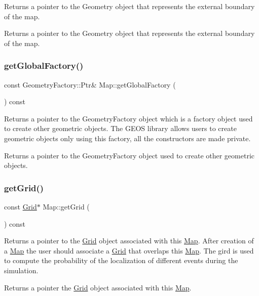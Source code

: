 Returns a pointer to the Geometry object that represents the external boundary of the map. \begin{DoxyReturn}{Returns}
a pointer to the Geometry object that represents the external boundary of the map. 
\end{DoxyReturn}
\mbox{\label{class_map_a69bd639b05daa393b051c76f0dc4af7c}} 
\subsubsection{\texorpdfstring{get\+Global\+Factory()}{getGlobalFactory()}}
{\footnotesize\ttfamily const Geometry\+Factory\+::\+Ptr\& Map\+::get\+Global\+Factory (\begin{DoxyParamCaption}{ }\end{DoxyParamCaption}) const}

Returns a pointer to the Geometry\+Factory object which is a factory object used to create other geometric objects. The G\+E\+OS library allows users to create geometric objects only using this factory, all the constructors are made private. \begin{DoxyReturn}{Returns}
a pointer to the Geometry\+Factory object used to create other geometric objects. 
\end{DoxyReturn}
\mbox{\label{class_map_aa9bf1c29b844f3b7fbf7a3153c24fef0}} 
\subsubsection{\texorpdfstring{get\+Grid()}{getGrid()}}
{\footnotesize\ttfamily const \hyperlink{class_grid}{Grid}$\ast$ Map\+::get\+Grid (\begin{DoxyParamCaption}{ }\end{DoxyParamCaption}) const}

Returns a pointer to the \hyperlink{class_grid}{Grid} object associated with this \hyperlink{class_map}{Map}. After creation of a \hyperlink{class_map}{Map} the user should associate a \hyperlink{class_grid}{Grid} that overlaps this \hyperlink{class_map}{Map}. The gird is used to compute the probability of the localization of different events during the simulation. \begin{DoxyReturn}{Returns}
a pointer the \hyperlink{class_grid}{Grid} object associated with this \hyperlink{class_map}{Map}. 
\end{DoxyReturn}
\mbox{\label{class_map_acede2ccba9bf0f987f3dde8c332bec17}} 
